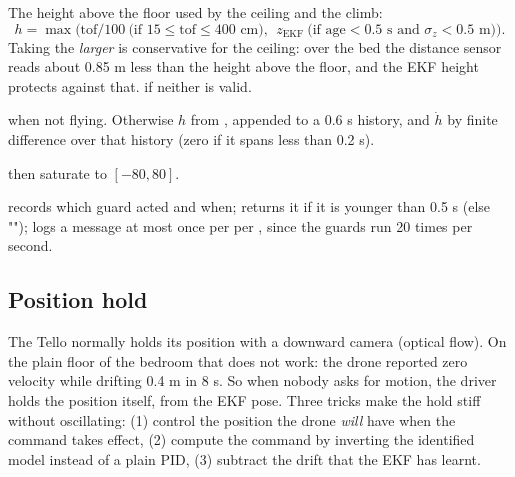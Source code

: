The height above the floor used by the ceiling and the climb:
$$
h = \max\big(\text{tof}/100 \ \text{(if } 15\le\text{tof}\le400\text{ cm)},\ \ z_{\text{EKF}}\ \text{(if age} <0.5\text{ s and } \sigma_z<0.5\text{ m)}\big).
$$
Taking the \emph{larger} is conservative for the ceiling: over the bed the distance sensor reads about 0.85 m less
than the height above the floor, and the EKF height protects against that.  if neither is valid.

 when not flying. Otherwise $h$ from , appended to a 0.6 s history, and
$\dot h$ by finite difference over that history (zero if it spans less than 0.2 s).

 then saturate to $[-80, 80]$.

 records which guard acted and when;  returns it if it is younger than 0.5 s (else
"");  logs a message at most once per  per , since the guards run 20 times per
second.

\subsection{Position hold}

\begin{intuition}
The Tello normally holds its position with a downward camera (optical flow). On the plain floor of the bedroom
that does not work: the drone reported zero velocity while drifting 0.4 m in 8 s. So when nobody asks for motion,
the driver holds the position itself, from the EKF pose. Three tricks make the hold stiff without oscillating:
(1) control the position the drone \emph{will} have when the command takes effect, (2) compute the command by
inverting the identified model instead of a plain PID, (3) subtract the drift that the EKF has learnt.
\end{intuition}

